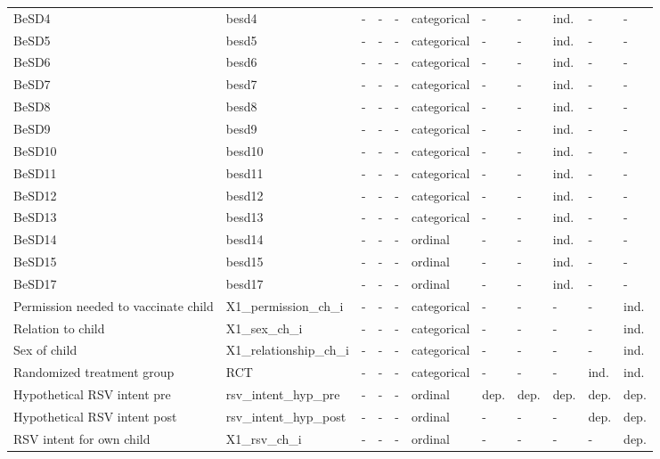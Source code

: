 \begin{tabular}{lllllllllll}
BeSD4 & besd4 & - & - & - & categorical & - & - & ind. & - & - \\
BeSD5 & besd5 & - & - & - & categorical & - & - & ind. & - & - \\
BeSD6 & besd6 & - & - & - & categorical & - & - & ind. & - & - \\
BeSD7 & besd7 & - & - & - & categorical & - & - & ind. & - & - \\
BeSD8 & besd8 & - & - & - & categorical & - & - & ind. & - & - \\
BeSD9 & besd9 & - & - & - & categorical & - & - & ind. & - & - \\
BeSD10 & besd10 & - & - & - & categorical & - & - & ind. & - & - \\
BeSD11 & besd11 & - & - & - & categorical & - & - & ind. & - & - \\
BeSD12 & besd12 & - & - & - & categorical & - & - & ind. & - & - \\
BeSD13 & besd13 & - & - & - & categorical & - & - & ind. & - & - \\
BeSD14 & besd14 & - & - & - & ordinal & - & - & ind. & - & - \\
BeSD15 & besd15 & - & - & - & ordinal & - & - & ind. & - & - \\
BeSD17 & besd17 & - & - & - & ordinal & - & - & ind. & - & - \\
Permission needed to vaccinate child & X1\_permission\_ch\_i & - & - & - & categorical & - & - & - & - & ind. \\
Relation to child & X1\_sex\_ch\_i & - & - & - & categorical & - & - & - & - & ind. \\
Sex of child & X1\_relationship\_ch\_i & - & - & - & categorical & - & - & - & - & ind. \\
Randomized treatment group & RCT & - & - & - & categorical & - & - & - & ind. & ind. \\
Hypothetical RSV intent pre & rsv\_intent\_hyp\_pre & - & - & - & ordinal & dep. & dep. & dep. & dep. & dep. \\
Hypothetical RSV intent post & rsv\_intent\_hyp\_post & - & - & - & ordinal & - & - & - & dep. & dep. \\
RSV intent for own child & X1\_rsv\_ch\_i & - & - & - & ordinal & - & - & - & - & dep. \\
\bottomrule
\end{tabular}
